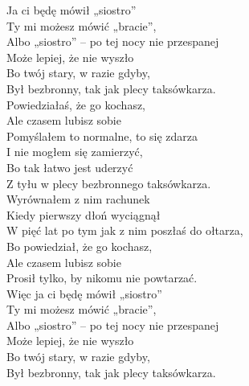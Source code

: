 
\begin{flushleft}
Ja ci będę mówił „siostro” \tab{}\\
Ty mi możesz mówić „bracie”,\tab{} \\
Albo „siostro” – po tej nocy nie przespanej  \\
Może lepiej, że nie wyszło \tab{} \\
Bo twój stary, w razie gdyby,\tab{} \\
Był bezbronny, tak jak plecy taksówkarza. \\
\vskip 3mm
\hspace{0.45cm}Powiedziałaś, że go kochasz, \\
\hspace{0.45cm}Ale czasem lubisz sobie \tab{}\\
\hspace{0.45cm}Pomyślałem to normalne, to się zdarza  \\
\hspace{0.45cm}I nie mogłem się zamierzyć,\tab{} \\
\hspace{0.45cm}Bo tak łatwo jest uderzyć \tab{}\\
\hspace{0.45cm}Z tyłu w plecy bezbronnego taksówkarza.  \\
\vskip 3mm
\hspace{0.9cm}Wyrównałem z nim rachunek\tab{} \\
\hspace{0.9cm}Kiedy pierwszy dłoń wyciągnął \tab{}\\
\hspace{0.9cm}W pięć lat po tym jak z nim poszłaś do ołtarza, \\
\hspace{0.9cm}Bo powiedział, że go kochasz,\tab{}  \\
\hspace{0.9cm}Ale czasem lubisz sobie\tab{}\tab{}  \\
\hspace{0.9cm}Prosił tylko, by nikomu nie powtarzać.\tab{}  \\
\vskip 3mm
Więc ja ci będę mówił „siostro” \\
Ty mi możesz mówić „bracie”, \\
Albo „siostro” – po tej nocy nie przespanej \\
Może lepiej, że nie wyszło \\
Bo twój stary, w razie gdyby, \\
Był bezbronny, tak jak plecy taksówkarza. \\
\end{flushleft}
\clearpage
